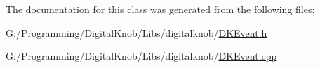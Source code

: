 The documentation for this class was generated from the following files\-:\begin{DoxyCompactItemize}
\item 
G\-:/\-Programming/\-Digital\-Knob/\-Libs/digitalknob/\hyperlink{_d_k_event_8h}{D\-K\-Event.\-h}\item 
G\-:/\-Programming/\-Digital\-Knob/\-Libs/digitalknob/\hyperlink{_d_k_event_8cpp}{D\-K\-Event.\-cpp}\end{DoxyCompactItemize}

